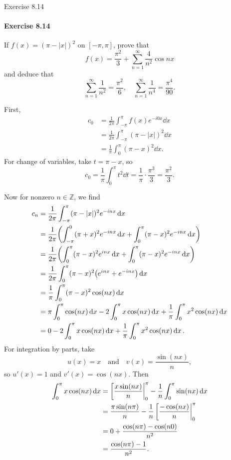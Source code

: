 \documentclass[12pt]{article}
\newenvironment{fullbox}{\begin{lrbox}{\savefullbox}\begin{minipage}{\dimexpr\textwidth-2\fboxsep\relax}}{\end{minipage}\end{lrbox}\begin{center}\framebox[\textwidth]{\usebox{\savefullbox}}\end{center}}
\newenvironment{pbox}[1][]{\begin{fullbox}\ifx#1\empty\else\paragraph{#1}\fi}{\end{fullbox}}
\theoremstyle{definition}
\newcommand{\isp}[1]{\quad\text{#1}\quad}
\newcommand{\Z}{\mathbb{Z}}
\begin{document}
\begin{pbox}[Exercise 8.14]
    If $f(x) = (\pi - |x|)^2$ on $[-\pi, \pi]$, prove that
    \[
        f(x) = \frac{\pi^2}{3} + \sum_{n=1}^{\infty} \frac{4}{n^2} \cos nx
    \]
    and deduce that
    \[
        \sum_{n=1}^{\infty} \frac{1}{n^2} = \frac{\pi^2}{6}, \quad \sum_{n=1}^{\infty} \frac{1}{n^4} = \frac{\pi^4}{90}.
    \]
\end{pbox}

First,
\begin{align*}
    c_0 
        &= \frac{1}{2\pi} \int_{-\pi}^{\pi} f(x)e^{-i0x} \dd{x} \\
        &= \frac{1}{2\pi} \int_{-\pi}^{\pi} (\pi - |x|)^2 \dd{x} \\
        &= \frac{1}{\pi} \int_{0}^{\pi} (\pi - x)^2 \dd{x}.
\end{align*}
For change of variables, take $t = \pi - x$, so
\[
    c_0 = \frac{1}{\pi} \int_{0}^{\pi} t^2 \dd{t}
        = \frac{1}{\pi} \cdot \frac{\pi^3}{3}
        = \frac{\pi^2}{3}.
\]

Now for nonzero $n \in \Z$, we find
\begin{align*}
    c_n 
        &= \frac{1}{2\pi} \int_{-\pi}^{\pi} (\pi - |x|)^2e^{-inx} \dd{x} \\ 
        &= \frac{1}{2\pi} \qty(\int_{-\pi}^{0} (\pi + x)^2e^{-inx} \dd{x} + \int_{0}^{\pi} (\pi - x)^2e^{-inx} \dd{x}) \\ 
        &= \frac{1}{2\pi} \qty(\int_{0}^{\pi} (\pi - x)^2e^{inx} \dd{x} + \int_{0}^{\pi} (\pi - x)^2e^{-inx} \dd{x}) \\ 
        &= \frac{1}{2\pi} \int_{0}^{\pi} (\pi - x)^2\qty(e^{inx} + e^{-inx}) \dd{x} \\ 
        &= \frac{1}{\pi} \int_{0}^{\pi} (\pi - x)^2 \cos(nx) \dd{x} \\ 
        &= \pi\int_{0}^{\pi} \cos(nx) \dd{x} - 2\int_{0}^{\pi} x\cos(nx) \dd{x} + \frac{1}{\pi}\int_{0}^{\pi} x^2\cos(nx) \dd{x} \\
        &= 0 - 2\int_{0}^{\pi} x\cos(nx) \dd{x} + \frac{1}{\pi}\int_{0}^{\pi} x^2\cos(nx) \dd{x}.
\end{align*}
For integration by parts, take
\[
    u(x) = x \isp{and} v(x) = \frac{\sin(nx)}{n},
\]
so $u'(x) = 1$ and $v'(x) = \cos(nx)$. Then
\begin{align*}
    \int_{0}^{\pi} x\cos(nx) \dd{x}
        &= \eval[\frac{x\sin(nx)}{n}|_{0}^{\pi} - \frac{1}{n} \int_{0}^{\pi} \sin(nx) \dd{x} \\
        &= \frac{\pi \sin(n\pi)}{n} - \frac{1}{n} \eval[\frac{-\cos(nx)}{n}|_{0}^{\pi} \\
        &= 0 + \frac{\cos(n\pi) - \cos(n0)}{n^2} \\
        &= \frac{\cos(n\pi) - 1}{n^2}.
\end{align*}
\end{document}

